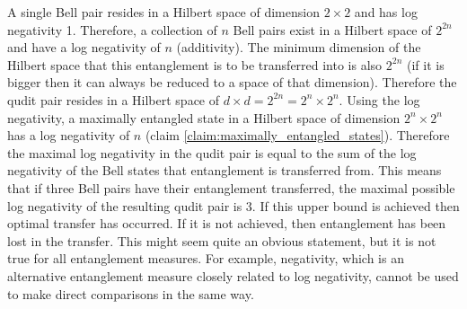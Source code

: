 A single Bell pair resides in a Hilbert space of dimension $2 \times 2$ and has log negativity 1.
Therefore, a collection of $n$ Bell pairs exist in a Hilbert space of $2^{2n}$ and have a log negativity of $n$ (additivity).
The minimum dimension of the Hilbert space that this entanglement is to be transferred into is also $2^{2n}$ (if it is bigger then it can always be reduced to a space of that dimension).
Therefore the qudit pair resides in a Hilbert space of $d\times d = 2^{2n} = 2^n \times 2^n$.
Using the log negativity, a maximally entangled state in a Hilbert space of dimension $2^n \times 2^n$ has a log negativity of $n$ (claim \ref{claim:maximally_entangled_states}).
Therefore the maximal log negativity in the qudit pair is equal to the sum of the log negativity of the Bell states that entanglement is transferred from.
This means that if three Bell pairs have their entanglement transferred, the maximal possible log negativity of the resulting qudit pair is 3.
If this upper bound is achieved then optimal transfer has occurred.
If it is not achieved, then entanglement has been lost in the transfer.
This might seem quite an obvious statement, but it is not true for all entanglement measures.
For example, negativity, which is an alternative entanglement measure closely related to log negativity, cannot be used to make direct comparisons in the same way.